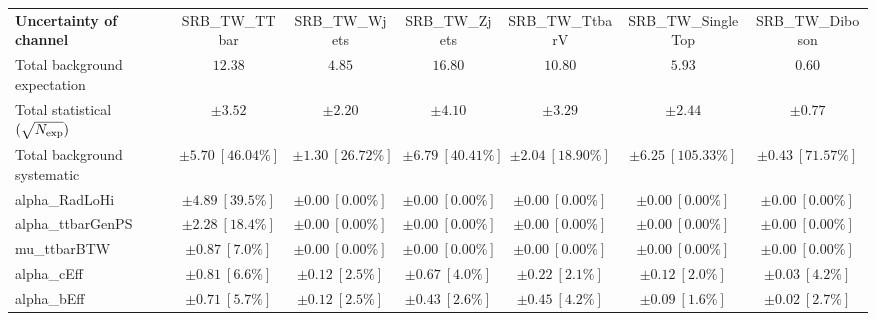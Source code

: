 
\begin{sidewaystable}
\begin{center}
\setlength{\tabcolsep}{0.0pc}
\begin{tabular*}{\textwidth}{@{\extracolsep{\fill}}lcccccc}
\noalign{\smallskip}\hline\noalign{\smallskip}
{\bf Uncertainty of channel}                                    & SRB\_TW\_TTbar            & SRB\_TW\_Wjets            & SRB\_TW\_Zjets            & SRB\_TW\_TtbarV            & SRB\_TW\_SingleTop            & SRB\_TW\_Diboson            \\
\noalign{\smallskip}\hline\noalign{\smallskip}
Total background expectation             &  $12.38$        &  $4.85$        &  $16.80$        &  $10.80$        &  $5.93$        &  $0.60$       \\
\noalign{\smallskip}\hline\noalign{\smallskip}
Total statistical $(\sqrt{N_{\rm exp}})$              & $\pm 3.52$        & $\pm 2.20$        & $\pm 4.10$        & $\pm 3.29$        & $\pm 2.44$        & $\pm 0.77$       \\
Total background systematic               & $\pm 5.70\ [46.04\%] $        & $\pm 1.30\ [26.72\%] $        & $\pm 6.79\ [40.41\%] $        & $\pm 2.04\ [18.90\%] $        & $\pm 6.25\ [105.33\%] $        & $\pm 0.43\ [71.57\%] $             \\
\noalign{\smallskip}\hline\noalign{\smallskip}
\noalign{\smallskip}\hline\noalign{\smallskip}
alpha\_RadLoHi         & $\pm 4.89\ [39.5\%] $          & $\pm 0.00\ [0.00\%] $          & $\pm 0.00\ [0.00\%] $          & $\pm 0.00\ [0.00\%] $          & $\pm 0.00\ [0.00\%] $          & $\pm 0.00\ [0.00\%] $       \\
alpha\_ttbarGenPS         & $\pm 2.28\ [18.4\%] $          & $\pm 0.00\ [0.00\%] $          & $\pm 0.00\ [0.00\%] $          & $\pm 0.00\ [0.00\%] $          & $\pm 0.00\ [0.00\%] $          & $\pm 0.00\ [0.00\%] $       \\
mu\_ttbarBTW         & $\pm 0.87\ [7.0\%] $          & $\pm 0.00\ [0.00\%] $          & $\pm 0.00\ [0.00\%] $          & $\pm 0.00\ [0.00\%] $          & $\pm 0.00\ [0.00\%] $          & $\pm 0.00\ [0.00\%] $       \\
alpha\_cEff         & $\pm 0.81\ [6.6\%] $          & $\pm 0.12\ [2.5\%] $          & $\pm 0.67\ [4.0\%] $          & $\pm 0.22\ [2.1\%] $          & $\pm 0.12\ [2.0\%] $          & $\pm 0.03\ [4.2\%] $       \\
alpha\_bEff         & $\pm 0.71\ [5.7\%] $          & $\pm 0.12\ [2.5\%] $          & $\pm 0.43\ [2.6\%] $          & $\pm 0.45\ [4.2\%] $          & $\pm 0.09\ [1.6\%] $          & $\pm 0.02\ [2.7\%] $       \\

\end{tabular*}
\end{center}
\end{sidewaystable}
